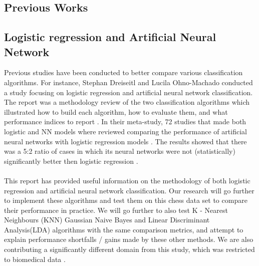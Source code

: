 \documentclass{article}
\begin{document}
\begin{multicols}{2}

\section{Previous Works}
\subsection{Logistic regression and Artificial Neural Network}
Previous studies have been conducted to better compare various classification algorithms. For instance, Stephan Dreiseitl and Lucila Ohno-Machado conducted a study focusing on logistic regression and artificial neural network classification\cite{PWork}. The report was a methodology review of the two classification algorithms which illustrated how to build each algorithm, how to evaluate them, and what performance indices to report \cite{PWork}. In their meta-study, 72 studies that made both logistic and NN models where reviewed comparing the performance of artificial neural networks with logistic regression models \cite{PWork}. The results showed that there was a 5:2 ratio of cases in which its neural networks were not (statistically) significantly better then logistic regression \cite{PWork}.  
\\\\
This report has provided useful information on the methodology of both logistic regression and artificial neural network classification. Our research will go further to implement these algorithms and test them on this chess data set to compare their performance in practice. We will go further to also test K - Nearest Neighbours (KNN) Gaussian Naive Bayes and Linear Discriminant Analysis(LDA) algorithms with the same comparison metrics, and attempt to explain performance shortfalls / gains made by these other methods. We are also contributing a significantly different domain from this study, which was restricted to biomedical data \cite{PWork}.


\end{multicols}
\end{document}
